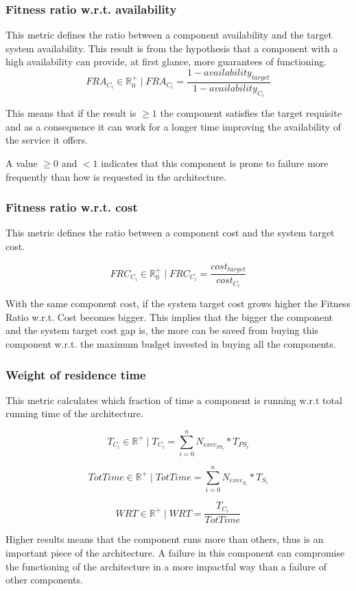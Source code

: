 \subsubsection{Fitness ratio w.r.t. availability}
\label{met:fra}
This metric defines the ratio between a component availability and the target system availability. This result is from the hypothesis that a component with a high availability can provide, at first glance, more guarantees of functioning. 
\[ FRA_{C_i} \in \mathbb{R}^+_0 \; | \; FRA_{C_i} = \frac{1 - availability_{target}}{1- availability_{C_i}} \]

This means that if the result is $\ge 1$ the component satisfies the target requisite and as a consequence it can work for a longer time improving the availability of the service it offers. 

A value $\ge 0 $ and $<1$ indicates that this component is prone to failure more frequently than how is requested in the architecture.

\subsubsection{Fitness ratio w.r.t. cost}
\label{met:frc}
This metric defines the ratio between a component cost and the system target cost. 

\[ FRC_{C_i} \in \mathbb{R}^+_0 \; | \; FRC_{C_i} = \frac{cost_{target}}{cost_{C_i}}\]

With the same component cost, if the system target cost grows higher the Fitness Ratio w.r.t. Cost becomes bigger. This implies that the bigger the component and the system target cost gap is, the more can be saved from buying this component w.r.t. the maximum budget invested in buying all the components.

\subsubsection{Weight of residence time}
\label{met:wrt}
This metric calculates which fraction of time a component is running w.r.t total running time of the architecture.

\[ T_{C_i} \in \mathbb{R}^+ \; | \; T_{C_i} = \sum_{i=0}^{n} N_{exec_{PS_i}} * T_{PS_i} \]

\[ TotTime \in \mathbb{R^+} \; | \; TotTime = \sum_{i=0}^{n}N_{exec_{S_i}} * T_{S_i} \]

\[ WRT \in \mathbb{R}^+ \; | \; WRT = \frac{T_{C_i}}{TotTime} \]

Higher results means that the component runs more than others, thus is an important piece of the architecture. A failure in this component can compromise the functioning of the architecture in a more impactful way than a failure of other components.


